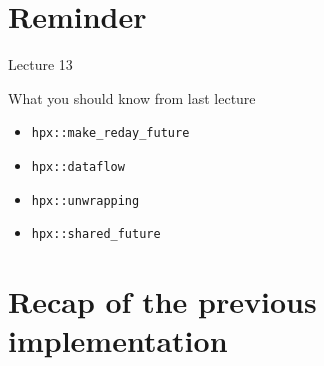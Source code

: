 \documentclass[\classoption]{beamer}
\title{\coursename}
\subtitle{Lecture 14: Serial partition-based 1D heat equation  }
\author{\tiny Patrick Diehl \orcid{0000-0003-3922-8419}}
\date {
 \tiny \url{\courseurl}
\vspace{2cm}
\doclicenseThis  
  
}
\begin{document}
 {
    \frame {
        \titlepage
    }
}

\frame{

\tableofcontents

}


\section{Reminder}
\begin{frame}{Lecture 13}
\begin{block}{What you should know from last lecture}
\begin{itemize}
\item \lstinline|hpx::make_reday_future|
\item \lstinline|hpx::dataflow|
\item \lstinline|hpx::unwrapping|
\item \lstinline|hpx::shared_future|
\end{itemize}
\end{block}
\end{frame}

\section{Recap of the previous implementation}
\end{document}

